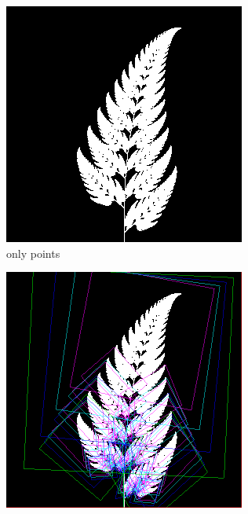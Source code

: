 \documentclass[11pt]{article}
\begin{document}
\begin{figure}
     \centering
     \begin{subfigure}[b]{0.3\textwidth}
         \centering
         \includegraphics[width=\textwidth]{figures/barnsley_points}
         \caption{only points}
         \label{figure:barnsley_points}
     \end{subfigure}
     \hfill
     \begin{subfigure}[b]{0.3\textwidth}
         \centering
         \includegraphics[width=\textwidth]{figures/barnsley_guides_and_points}

\end{subfigure}
\end{figure}
\end{document}
